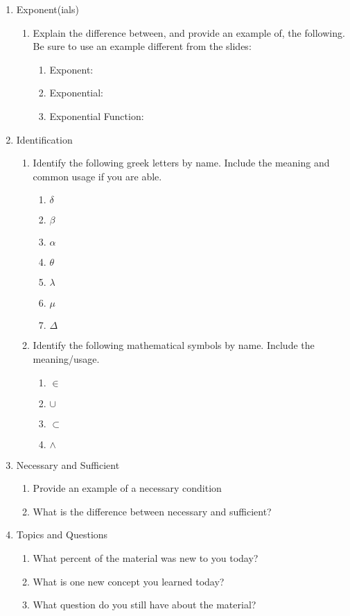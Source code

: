 \documentclass[11pt]{article}
\begin{document}
\begin{enumerate}
\item Exponent(ials)
\begin{enumerate}
\item Explain the difference between, and provide an example of, the following. Be sure to use an example different from the slides: 
	\begin{enumerate}
	\item Exponent:
	\item Exponential:
	\item Exponential Function: 
	\end{enumerate}
\end{enumerate}


\item Identification
\begin{enumerate}
\item Identify the following greek letters by name. Include the meaning and common usage if you are able. 
\begin{enumerate}
\item $\delta$
\item $\beta$
\item $\alpha$
\item $\theta$
\item $\lambda$
\item $\mu$
\item $\Delta$
\end{enumerate}

\item Identify the following mathematical symbols by name. Include the meaning/usage. 
\begin{enumerate}
\item $\in$
\item $\cup$
\item $\subset$
\item $\wedge$
\end{enumerate}
\end{enumerate}

\item Necessary and Sufficient
\begin{enumerate}
\item Provide an example of a necessary condition 
\item What is the difference between necessary and sufficient?
\end{enumerate}

\item Topics and Questions
\begin{enumerate}
\item What percent of the material was new to you today?
\item What is one new concept you learned today?
\item What question do you still have about the material?
\end{enumerate}

\end{enumerate}
\end{document}
